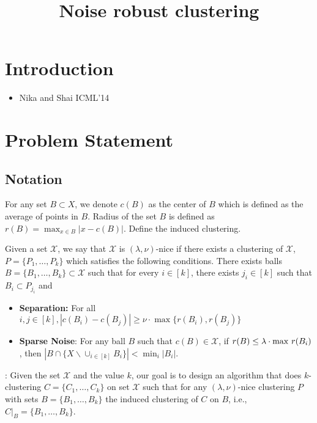 \documentclass[11pt]{article}
\title{\LARGE Noise robust clustering}
\author{}
\begin{document}
\maketitle

\section{Introduction}
\begin{itemize}
\item Nika and Shai ICML'14
\end{itemize}

\section{Problem Statement}

\subsection{Notation}
For any set $B\subset X$, we denote $c(B)$ as the center of $B$ which is defined as the average of points in $B$. Radius of the set $B$ is defined as $r(B)=\max_{x\in B} |x-c(B)|$. Define the induced clustering.

\begin{definition}
Given a set $\mathcal{X}$, we say that $\mathcal{X}$ is $(\lambda,\nu)$-nice if there exists a clustering of $\mathcal{X}$, $P=\{P_1,\ldots,P_k\}$ which satisfies the following conditions. There exists balls $B=\{B_1,\ldots,B_k\}\subset \mathcal{X}$ such that for every $i\in[k]$, there exists $j_i\in[k]$ such that $B_i\subset P_{j_i}$ and
\begin{itemize}
\item{\bf{Separation}:} For all $i,j\in[k], |c(B_i)-c(B_j)|\geq \nu\cdot\max\{r(B_i),r(B_j)\}$
\item{\bf{Sparse Noise}}: For any ball $B$ such that $c(B)\in \mathcal{X}$, if $r(B)\leq \lambda \cdot \max \thinspace r(B_i)$, then $|B\cap \{X \backslash \cup_{i\in[k]} B_i\}| < \min_i |B_i|$.
\end{itemize}
\end{definition}

: Given the set $\mathcal{X}$ and the value $k$, our goal is to design an algorithm that does $k$-clustering $C=\{C_1,\ldots,C_k\}$ on set $\mathcal{X}$ such that  for any $(\lambda,\nu)$-nice clustering $P$ with sets $B = \{B_1,\ldots,B_k\}$ the induced clustering of $C$ on $B$, i.e., $C|_B = \{B_1,\ldots,B_k\}$. 
\end{document}
